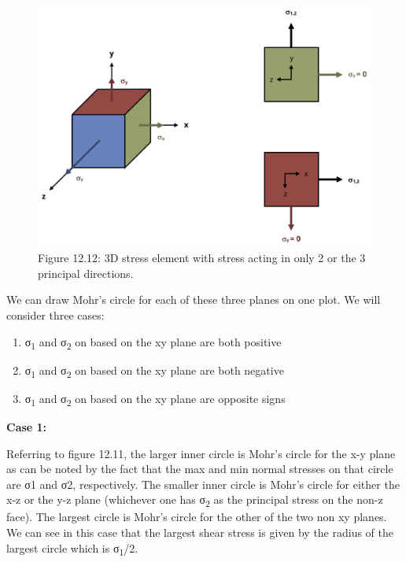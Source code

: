 \documentclass[
  letterpaper,
  DIV=11,
  numbers=noendperiod]{scrreprt}
\theoremstyle{definition}
\theoremstyle{remark}
\begin{document}
\begin{figure}[H]

{\centering \includegraphics[width=6.67708in,height=\textheight]{images/CH12 figures/figure 12.12.png}

}

\caption{Figure 12.12: 3D stress element with stress acting in only 2 or
the 3 principal directions.}

\end{figure}%

We can draw Mohr's circle for each of these three planes on one plot. We
will consider three cases:

\begin{enumerate}
\def\labelenumi{\arabic{enumi}.}
\item
  σ\textsubscript{1} and σ\textsubscript{2} on based on the xy plane are
  both positive
\item
  σ\textsubscript{1} and σ\textsubscript{2} on based on the xy plane are
  both negative
\item
  σ\textsubscript{1} and σ\textsubscript{2} on based on the xy plane are
  opposite signs
\end{enumerate}

\textbf{Case 1:}

Referring to figure 12.11, the larger inner circle is Mohr's circle for
the x-y plane as can be noted by the fact that the max and min normal
stresses on that circle are σ1 and σ2, respectively. The smaller inner
circle is Mohr's circle for either the x-z or the y-z plane (whichever
one has σ\textsubscript{2} as the principal stress on the non-z face).
The largest circle is Mohr's circle for the other of the two non xy
planes. We can see in this case that the largest shear stress is given
by the radius of the largest circle which is σ\textsubscript{1}/2.
\end{document}

